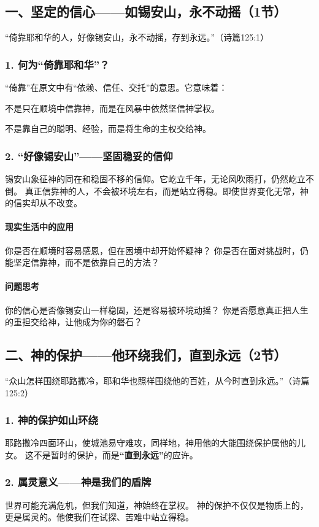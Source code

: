 \documentclass[a4paper, 12pt]{article}
\begin{document}
\subsection*{一、坚定的信心——如锡安山，永不动摇（1节）}
“倚靠耶和华的人，好像锡安山，永不动摇，存到永远。”（诗篇125:1）

\subsubsection*{1. 何为“倚靠耶和华”？}
“倚靠”在原文中有“依赖、信任、交托”的意思。它意味着：

不是只在顺境中信靠神，而是在风暴中依然坚信神掌权。

不是靠自己的聪明、经验，而是将生命的主权交给神。
\subsubsection*{2. “好像锡安山”——坚固稳妥的信仰}
锡安山象征神的同在和稳固不移的信仰。它屹立千年，无论风吹雨打，仍然屹立不倒。
真正信靠神的人，不会被环境左右，而是站立得稳。即使世界变化无常，神的信实却从不改变。
\paragraph*{现实生活中的应用}
你是否在顺境时容易感恩，但在困境中却开始怀疑神？
你是否在面对挑战时，仍能坚定信靠神，而不是依靠自己的方法？
\paragraph*{问题思考}

你的信心是否像锡安山一样稳固，还是容易被环境动摇？
你是否愿意真正把人生的重担交给神，让他成为你的磐石？
\subsection*{二、神的保护——他环绕我们，直到永远（2节）}
“众山怎样围绕耶路撒冷，耶和华也照样围绕他的百姓，从今时直到永远。”（诗篇125:2）

\subsubsection*{1. 神的保护如山环绕}
耶路撒冷四面环山，使城池易守难攻，同样地，神用他的大能围绕保护属他的儿女。
这不是暂时的保护，而是\textbf{“直到永远”}的应许。
\subsubsection*{2. 属灵意义——神是我们的盾牌}
世界可能充满危机，但我们知道，神始终在掌权。
神的保护不仅仅是物质上的，更是属灵的。他使我们在试探、苦难中站立得稳。
\end{document}
